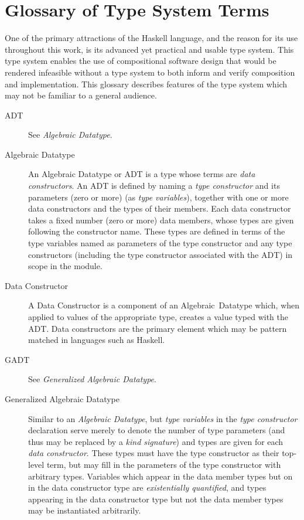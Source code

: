 \chapter{Glossary of Type System Terms}
\label{chapter:Glossary_of_Type_System_Terms}

One of the primary attractions of the Haskell language, and the reason for its
use throughout this work, is its advanced yet practical and usable type system.
This type system enables the use of compositional software design that would
be rendered infeasible without a type system to both inform and verify
composition and implementation. This glossary describes features of the type
system which may not be familiar to a general audience.

\begin{description}
\item[ADT] See {\em Algebraic Datatype}.

\item[Algebraic Datatype] An Algebraic Datatype or ADT is a type whose terms
are {\em data constructors}. An ADT is defined by naming a
{\em type constructor} and its parameters (zero or more)
(as {\em type variables}), together with one or more data constructors and the
types of their members. Each data constructor takes a fixed number
(zero or more) data members, whose types are given following the constructor
name. These types are defined in terms of the type variables named as parameters
of the type constructor and any type constructors (including the type
constructor associated with the ADT) in scope in the module.

\item[Data Constructor] A Data Constructor is a component of an
Algebraic~Datatype which, when applied to values of the appropriate type, 
creates a value typed with the ADT. Data constructors are the primary element
which may be pattern matched in languages such as Haskell.

\item[GADT] See {\em Generalized Algebraic Datatype}.

\item[Generalized Algebraic Datatype] Similar to an {\em Algebraic Datatype},
but {\em type variables} in the {\em type constructor} declaration serve merely
to denote the number of type parameters (and thus may be replaced by a
{\em kind signature}) and types are given for each {\em data constructor}. These
types must have the type constructor as their top-level term, but may fill in
the parameters of the type constructor with arbitrary types. Variables which
appear in the data member types but on in the data constructor type are
{\em existentially quantified}, and types appearing in the data constructor
type but not the data member types may be instantiated arbitrarily.


\end{description}
